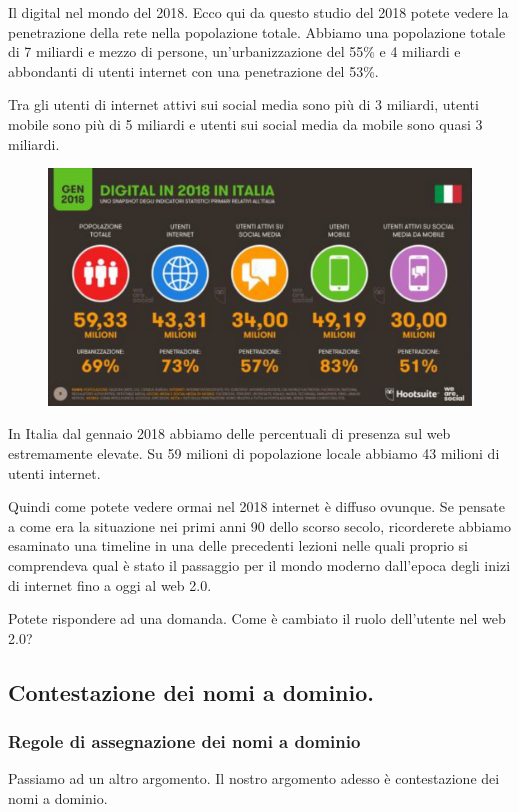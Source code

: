       Il digital nel mondo del 2018. Ecco qui da questo studio del 2018 potete vedere la penetrazione della rete nella popolazione totale. Abbiamo una popolazione totale di 7 miliardi e mezzo di persone, un'urbanizzazione del 55\% e 4 miliardi e abbondanti di utenti internet con una penetrazione del 53\%. \par
      Tra gli utenti di internet attivi sui social media sono più di 3 miliardi, utenti mobile sono più di 5 miliardi e utenti sui social media da mobile sono quasi 3 miliardi. \par
      
      \begin{figure}[h]
          \centering
          \includegraphics[width=0.75\linewidth]{images/06_lez_fig_03.jpg}
      \end{figure}
      
      In Italia dal gennaio 2018 abbiamo delle percentuali di presenza sul web estremamente elevate. Su 59 milioni di popolazione locale abbiamo 43 milioni di utenti internet. \par
      Quindi come potete vedere ormai nel 2018 internet è diffuso ovunque. Se pensate a come era la situazione nei primi anni 90 dello scorso secolo, ricorderete abbiamo esaminato una timeline in una delle precedenti lezioni nelle quali proprio si comprendeva qual è stato il passaggio per il mondo moderno dall'epoca degli inizi di internet fino a oggi al web 2.0. \par
      Potete rispondere ad una domanda. Come è cambiato il ruolo dell'utente nel web 2.0?
      
      \subsection{Contestazione dei nomi a dominio.}
      \subsubsection{Regole di assegnazione dei nomi a dominio}
      Passiamo ad un altro argomento. Il nostro argomento adesso è contestazione dei nomi a dominio. 
